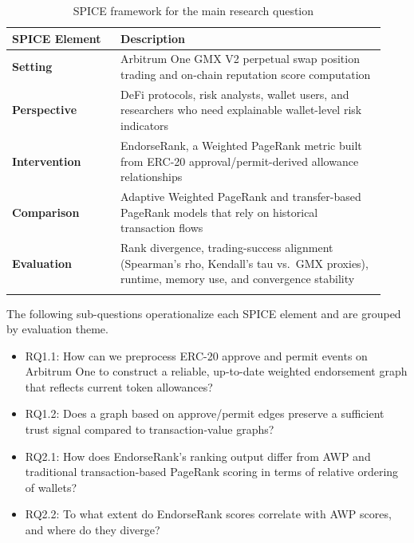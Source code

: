 \begin{longtable}{>{\raggedright\arraybackslash}p{0.27\linewidth}>{\raggedright\arraybackslash}p{0.66\linewidth}}
\caption{SPICE framework for the main research question}\\
\toprule
\textbf{SPICE Element} & Description \\
\midrule
\textbf{Setting} & Arbitrum One GMX V2 perpetual swap position trading and on-chain reputation score computation \\
\addlinespace
\textbf{Perspective} & DeFi protocols, risk analysts, wallet users, and researchers who need explainable wallet-level risk indicators \\
\addlinespace
\textbf{Intervention} & EndorseRank, a Weighted PageRank metric built from ERC-20 approval/permit-derived allowance relationships \\
\addlinespace
\textbf{Comparison} & Adaptive Weighted PageRank and transfer-based PageRank models that rely on historical transaction flows \\
\addlinespace
\textbf{Evaluation} & Rank divergence, trading-success alignment (Spearman's rho, Kendall's tau vs.\ GMX proxies), runtime, memory use, and convergence stability \\
\addlinespace
\bottomrule
\end{longtable}

The following sub-questions operationalize each SPICE element and are grouped by evaluation theme.


\begin{itemize}
\item[\textendash] RQ1.1: How can we preprocess ERC-20 approve and permit events on Arbitrum One to construct a reliable, up-to-date weighted endorsement graph that reflects current token allowances?
\item[\textendash] RQ1.2: Does a graph based on approve/permit edges preserve a sufficient trust signal compared to transaction-value graphs?
\end{itemize}

\begin{itemize}
\item[\textendash] RQ2.1: How does EndorseRank's ranking output differ from AWP and traditional transaction-based PageRank scoring in terms of relative ordering of wallets?
\item[\textendash] RQ2.2: To what extent do EndorseRank scores correlate with AWP scores, and where do they diverge?
\end{itemize}

